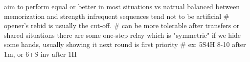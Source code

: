 aim to perform equal or better in most situations vs natrual
balanced between memorization and strength
    infrequent sequences tend not to be artificial
    # opener's rebid is usually the cut-off.
    # can be more tolerable after transfers or shared situations
there are some one-step relay which is "symmetric"
if we hide some hands, usually showing it next round is first priority
    # ex: 5S4H 8-10 after 1m, or 6+S inv after 1H